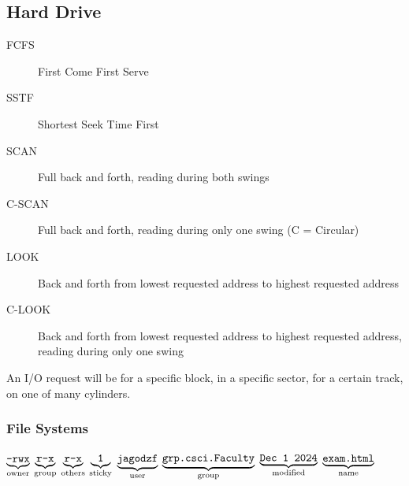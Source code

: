 \documentclass[a4paper]{article}
\newcommand{\undertext}[2] {$\underbrace{\textrm{#1}}_{\textrm{#2}}$}
\newcommand{\resetsize}{\footnotesize}
\begin{document}
\begin{multicols*}{2}
\begin{flushright}
        \subsection*{Hard Drive}
    \end{flushright}
    \vspace*{-2em}
    \begin{description}
        \item[FCFS] First Come First Serve
        \item[SSTF] Shortest Seek Time First
        \item[SCAN] Full back and forth, reading during both swings
        \item[C-SCAN] Full back and forth, reading during only one swing (C = Circular)
        \item[LOOK] Back and forth from lowest requested address to highest requested address
        \item[C-LOOK] Back and forth from lowest requested address to highest
            requested address, reading during only one swing
    \end{description}
    An I/O request will be for a specific block, in a specific sector, for a certain track, on one of many cylinders.

    \begin{flushright}
        \vspace*{-2em}
        \subsubsection*{File Systems}
    \end{flushright}
    \undertext{\texttt{-rwx}}{owner}
    \undertext{\texttt{r-x}}{group}
    \undertext{\texttt{r-x}}{others}
    \undertext{\texttt{1}}{sticky}
    \undertext{\texttt{jagodzf}}{user}
    \undertext{\texttt{grp.csci.Faculty}}{group}
    \undertext{\texttt{Dec 1 2024}}{modified}
    \undertext{\texttt{exam.html}}{name}
\end{multicols*}

\newpage
\resetsize
\end{document}
